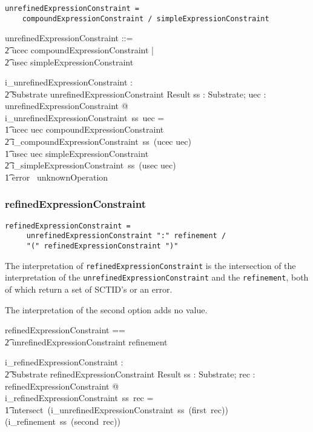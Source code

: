 \documentclass{article}
\def\spec#1{{\tt #1}}
\begin{document}
\begin{verbatim}
unrefinedExpressionConstraint = 
    compoundExpressionConstraint / simpleExpressionConstraint
\end{verbatim}

\begin{zed}
unrefinedExpressionConstraint ::= \\
\t2 ucec \ldata compoundExpressionConstraint \rdata | \\
\t2 usec \ldata simpleExpressionConstraint \rdata
\end{zed}
\begin{gendef}
   i\_unrefinedExpressionConstraint : \\
\t2 Substrate \fun unrefinedExpressionConstraint \fun Result
\where
   \forall ss : Substrate; uec : unrefinedExpressionConstraint @  \\
   i\_unrefinedExpressionConstraint~ss~uec = \\
\t1 \IF ucec \inv uec \in compoundExpressionConstraint \\
\t2 \THEN i\_compoundExpressionConstraint~ss~(ucec \inv uec) \\
\t1 \ELSE \IF usec \inv uec \in simpleExpressionConstraint  \\
\t2 \THEN i\_simpleExpressionConstraint~ss~(usec \inv uec) \\
\t1 \ELSE  error~ unknownOperation
\end{gendef}

\subsubsection{refinedExpressionConstraint}
\begin{verbatim}
refinedExpressionConstraint = 
     unrefinedExpressionConstraint ":" refinement /		
     "(" refinedExpressionConstraint ")"
\end{verbatim}

The interpretation of \spec{refinedExpressionConstraint} is the intersection of the interpretation of
the \spec{unrefinedExpressionConstraint} and the \spec{refinement}, both of which return a set of SCTID's or
an error.

The interpretation of the second option adds no value.
\begin{zed}
refinedExpressionConstraint == \\
\t2 unrefinedExpressionConstraint \cross refinement
\end{zed}

\begin{gendef}
   i\_refinedExpressionConstraint : \\
\t2 Substrate \pfun refinedExpressionConstraint \pfun Result
\where
   \forall ss : Substrate; rec : refinedExpressionConstraint @ \\
   i\_refinedExpressionConstraint~ss~rec = \\
\t1 intersect~(i\_unrefinedExpressionConstraint~ss~(first~rec)) (i\_refinement~ss~(second~rec))
\end{gendef}
\end{document}
